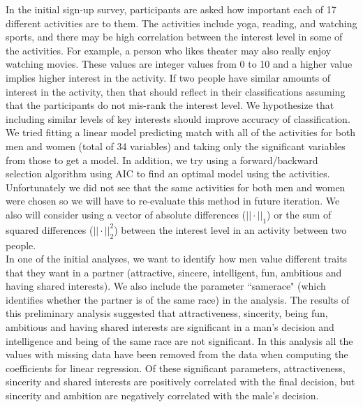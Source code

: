 \documentclass{article}
\begin{document}

In the initial sign-up survey, participants are asked how important each of 17 different activities are to them.  The activities include yoga, reading, and watching sports, and there may be high correlation between the interest level in some of the activities.  For example, a person who likes theater may also really enjoy watching movies.  These values are integer values from 0 to 10 and a higher value implies higher interest in the activity.  If two people have similar amounts of interest in the activity, then that should reflect in their classifications assuming that the participants do not mis-rank the interest level. We hypothesize that including similar levels of key interests should improve accuracy of classification.\\  

We tried fitting a linear model predicting match with all of the activities for both men and women (total of 34 variables) and taking only the significant variables from those to get a model.  In addition, we try using a forward/backward selection algorithm using AIC to find an optimal model using the activities.  Unfortunately we did not see that the same activities for both men and women were chosen so we will have to re-evaluate this method in future iteration.  We also will consider using a vector of absolute differences ($||\cdot||_1$) or the sum of squared differences ($||\cdot||_2^2$) between the interest level in an activity between two people. \\

In one of the initial analyses, we want to identify how men value different traits that they want in a partner (attractive, sincere, intelligent, fun, ambitious and having shared interests). We also include the parameter ``samerace" (which identifies whether the partner is of the same race) in the analysis. The results of this preliminary analysis suggested that attractiveness, sincerity, being fun, ambitious and having shared interests are significant in a man's decision and intelligence and being of the same race are not significant.  In this analysis all the values with missing data have been removed from the data when computing the coefficients for linear regression. Of these significant parameters, attractiveness, sincerity and shared interests are positively correlated with the final decision, but sincerity and ambition are negatively correlated with the male's decision. \\
\end{document}
